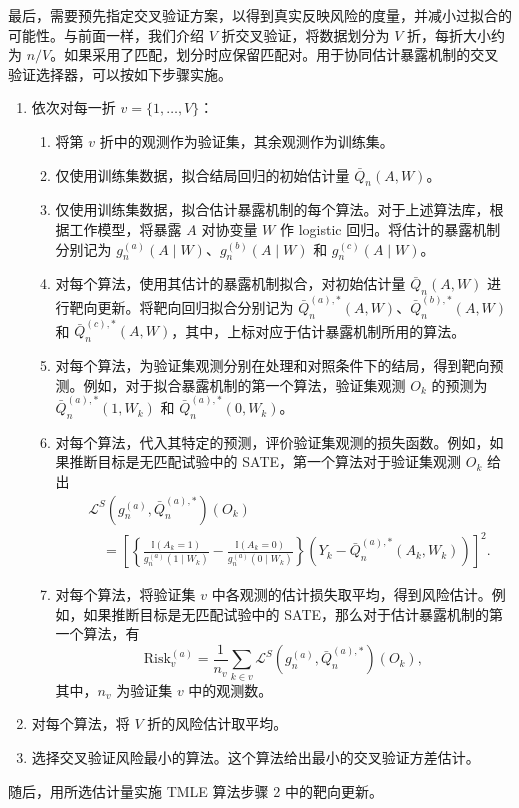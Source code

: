 最后，需要预先指定交叉验证方案，以得到真实反映风险的度量，并减小过拟合的可能性。与前面一样，我们介绍 $V$ 折交叉验证，将数据划分为 $V$ 折，每折大小约为 $n/V$。如果采用了匹配，划分时应保留匹配对。用于协同估计暴露机制的交叉验证选择器，可以按如下步骤实施。
\begin{enumerate}[label=(\Alph*)]
 \item 依次对每一折 $v=\{1,\ldots,V\}$：
 \begin{enumerate}[label=(\alph*)]
  \item 将第 $v$ 折中的观测作为验证集，其余观测作为训练集。
  \item 仅使用训练集数据，拟合结局回归的初始估计量 $\bar Q_n(A,W)$。
  \item 仅使用训练集数据，拟合估计暴露机制的每个算法。对于上述算法库，根据工作模型，将暴露 $A$ 对协变量 $W$ 作 logistic 回归。将估计的暴露机制分别记为
  $g_n^{(a)}(A\mid W)$、$g_n^{(b)}(A\mid W)$ 和 $g_n^{(c)}(A\mid W)$。
  \item 对每个算法，使用其估计的暴露机制拟合，对初始估计量 $\bar Q_n(A,W)$ 进行靶向更新。将靶向回归拟合分别记为
  $\bar Q_n^{(a),*}(A,W)$、$\bar Q_n^{(b),*}(A,W)$ 和 $\bar Q_n^{(c),*}(A,W)$，其中，上标对应于估计暴露机制所用的算法。
  \item 对每个算法，为验证集观测分别在处理和对照条件下的结局，得到靶向预测。例如，对于拟合暴露机制的第一个算法，验证集观测 $O_k$ 的预测为
  $\bar Q_n^{(a),*}(1,W_k)$ 和 $\bar Q_n^{(a),*}(0,W_k)$。
  \item 对每个算法，代入其特定的预测，评价验证集观测的损失函数。例如，如果推断目标是无匹配试验中的 SATE，第一个算法对于验证集观测 $O_k$ 给出
  \[
   \begin{aligned}
   &\mathcal L^S(g_n^{(a)},\bar Q_n^{(a),*})(O_k)\\
   &\quad=\left[\left\{\frac{\mathbb I(A_k=1)}{g_n^{(a)}(1\mid W_k)}
              -\frac{\mathbb I(A_k=0)}{g_n^{(a)}(0\mid W_k)}\right\}
         (Y_k-\bar Q_n^{(a),*}(A_k,W_k))\right]^2.
   \end{aligned}
  \]
  \item 对每个算法，将验证集 $v$ 中各观测的估计损失取平均，得到风险估计。例如，如果推断目标是无匹配试验中的 SATE，那么对于估计暴露机制的第一个算法，有
  \[
   \mathrm{Risk}_v^{(a)}
   =\frac1{n_v}\sum_{k\in v}
     \mathcal L^S(g_n^{(a)},\bar Q_n^{(a),*})(O_k),
  \]
  其中，$n_v$ 为验证集 $v$ 中的观测数。
 \end{enumerate}
 \item 对每个算法，将 $V$ 折的风险估计取平均。
 \item 选择交叉验证风险最小的算法。这个算法给出最小的交叉验证方差估计。
\end{enumerate}
随后，用所选估计量实施 TMLE 算法步骤 2 中的靶向更新。

